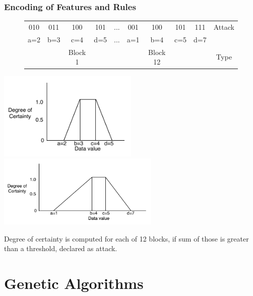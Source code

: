 \documentclass{beamer}
\newcommand{\tab}[1]{\hspace{.2\textwidth}\rlap{#1}}
\begin{document}
\begin{frame}
	\frametitle{Encoding of Features and Rules}
\begin{figure}
\begin{small}
\begin{tabular}{|cccc|c|cccc|c|} \hline
010 & 011 & 100 & 101   & ... & 001 & 100 & 101 & 111   & Attack\\
a=2 & b=3 & c=4 & d=5   & ... & a=1 & b=4 & c=5 & d=7   &\\ 
    &     & Block 1&    &        &     & Block 12& &       & Type\\
\hline\end{tabular}
\end{small}
\end{figure}
\tab{$\downarrow$} \tab{} \tab{} \tab{$\downarrow$}
  \includegraphics[width=0.50\textwidth]{../Talk/MutCrossTrapezoids/mut2345.pdf}
  \includegraphics[width=0.58\textwidth]{../Talk/MutCrossTrapezoids/cross1457.pdf}

Degree of certainty is computed for each of 12 blocks, if sum of those is greater than a threshold, declared as attack.
\end{frame}
\section[Genetic Algorithms]{Genetic Algorithms}
\end{document}
